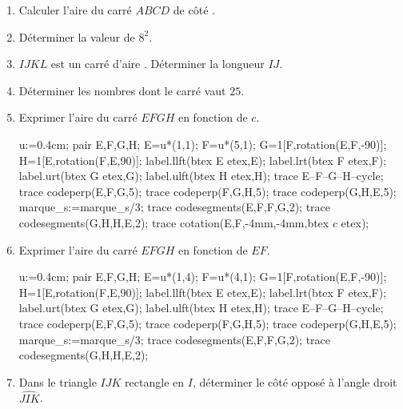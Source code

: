 \begin{activite}
    \vspace*{-10mm}
    \begin{spacing}{1.5}
        \begin{enumerate}
            \item Calculer l'aire du carré $ABCD$ de côté .
            \item Déterminer la valeur de $8^2$.
            \item $IJKL$ est un carré d'aire . Déterminer la longueur $IJ$.
            \item Déterminer les nombres dont le carré vaut $25$.
            \item Exprimer l'aire du carré $EFGH$ en fonction de $c$.
            
            \begin{Geometrie}[CoinBG={(-u,-u)},CoinHD={(6u,6u)}]
                u:=0.4cm;
                pair E,F,G,H;
                E=u*(1,1);
                F=u*(5,1);
                G=1[F,rotation(E,F,-90)];
                H=1[E,rotation(F,E,90)];
                label.llft(btex E etex,E);
                label.lrt(btex  F etex,F);
                label.urt(btex  G etex,G);
                label.ulft(btex H etex,H);
                trace E--F--G--H--cycle;
                trace codeperp(E,F,G,5);
                trace codeperp(F,G,H,5);
                trace codeperp(G,H,E,5);
                marque_s:=marque_s/3;
                trace codesegments(E,F,F,G,2);
                trace codesegments(G,H,H,E,2);
                trace cotation(E,F,-4mm,-4mm,btex $c$ etex);
            \end{Geometrie}
            \item Exprimer l'aire du carré $EFGH$ en fonction de $EF$.
            
            \begin{Geometrie}[CoinBG={(-u,-u)},CoinHD={(6u,6u)}]
                u:=0.4cm;
                pair E,F,G,H;
                E=u*(1,4);
                F=u*(4,1);
                G=1[F,rotation(E,F,-90)];
                H=1[E,rotation(F,E,90)];
                label.llft(btex E etex,E);
                label.lrt(btex  F etex,F);
                label.urt(btex  G etex,G);
                label.ulft(btex H etex,H);
                trace E--F--G--H--cycle;
                trace codeperp(E,F,G,5);
                trace codeperp(F,G,H,5);
                trace codeperp(G,H,E,5);
                marque_s:=marque_s/3;
                trace codesegments(E,F,F,G,2);
                trace codesegments(G,H,H,E,2);            
            \end{Geometrie}
            \item Dans le triangle $IJK$ rectangle en $I$, déterminer le côté opposé à l'angle droit $\widehat{JIK}$.
            

\end{enumerate}
\end{spacing}
\end{activite}
